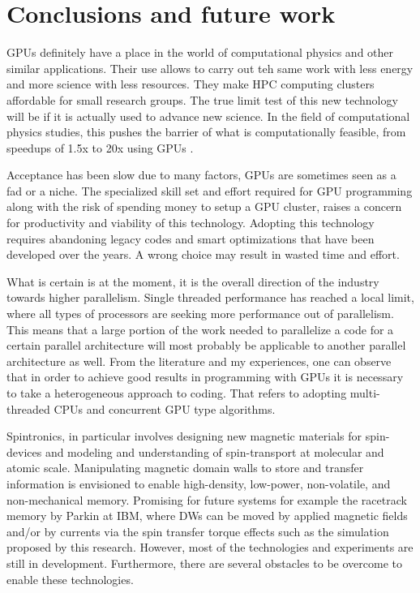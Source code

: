 
\chapter{Conclusions and future work} %

\label{Conclusions and future work} %


GPUs definitely have a place in the world of computational physics and other similar applications. Their use allows to carry out teh same work with less energy and more science with less resources. They make HPC computing clusters affordable for small research groups. The true limit test of this new technology will be if it is actually used to advance new science. In the field of computational physics studies, this pushes the barrier of what is computationally feasible, from speedups of 1.5x to 20x using GPUs \cite{applications}.

Acceptance has been slow due to many factors, GPUs are sometimes seen as a fad or a niche. The specialized skill set and effort required for GPU programming along with the risk of spending money to setup a GPU cluster, raises a concern for productivity and viability of this technology. Adopting this technology requires abandoning legacy codes and smart optimizations that have been developed over the years. A wrong choice may result in wasted time and effort.

What is certain is at the moment, it is the overall direction of the industry towards higher parallelism. Single threaded performance has reached a local limit, where all types of processors are seeking more performance out of parallelism. This means that a large portion of the work needed to parallelize a code for a certain parallel architecture will most probably be applicable to another parallel architecture as well. From the literature and my experiences, one can observe that in order to achieve good results in programming with GPUs it is necessary to take a heterogeneous approach to coding. That refers to adopting multi-threaded CPUs and concurrent GPU type algorithms.

Spintronics, in particular involves designing new magnetic materials for spin-devices and modeling and understanding of spin-transport at molecular and atomic scale. Manipulating magnetic domain walls to store and transfer information is envisioned to enable high-density, low-power, non-volatile, and non-mechanical memory. Promising for future systems for example the racetrack memory by Parkin at IBM, where DWs can be moved by applied magnetic fields and/or by currents via the spin transfer torque effects such as the simulation proposed by this research. However, most of the technologies and experiments  are still in development. Furthermore, there are several obstacles to be overcome to enable these technologies.

